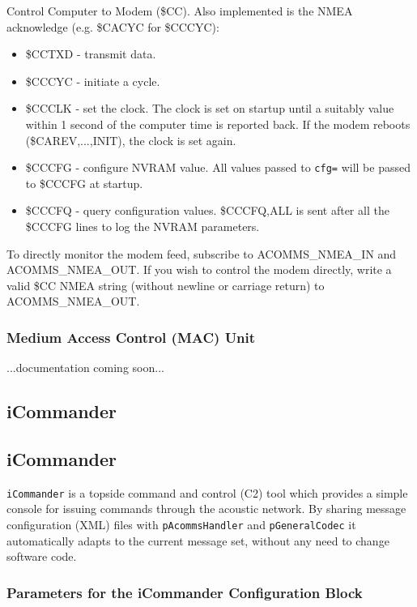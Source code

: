 \documentclass[11pt, letterpaper, oneside]{memoir}
\begin{document}
\begin{itemize}
Control Computer to Modem (\$CC). Also implemented is the NMEA acknowledge (e.g. \$CACYC for \$CCCYC):
\begin{itemize}
\item \$CCTXD - transmit data. 
\item \$CCCYC - initiate a cycle.
\item \$CCCLK - set the clock. The clock is set on startup until a suitably value within 1 second of the computer time is reported back. If the modem reboots (\$CAREV,...,INIT), the clock is set again.
\item \$CCCFG - configure NVRAM value. All values passed to \verb|cfg=| will be passed to \$CCCFG at startup. 
\item \$CCCFQ - query configuration values. \$CCCFQ,ALL is sent after all the \$CCCFG lines to log the NVRAM parameters.
\end{itemize}

To directly monitor the modem feed, subscribe to ACOMMS\_NMEA\_IN and ACOMMS\_NMEA\_OUT. If you wish to control the modem directly, write a valid \$CC NMEA string (without newline or carriage return) to ACOMMS\_NMEA\_OUT.

\subsubsection{Medium Access Control (MAC) Unit}

...documentation coming soon...


\subsection{iCommander}


\subsection{iCommander}\label{sec:icommander} 

\verb|iCommander| is a topside command and control (C2) tool which provides a simple
console for issuing commands through the acoustic network. By sharing
message configuration (XML) files with \verb|pAcommsHandler| and \verb|pGeneralCodec| it automatically adapts to the current message set,
without any need to change software code.

\subsubsection{Parameters for the iCommander Configuration Block}

\end{itemize}
\end{document}
